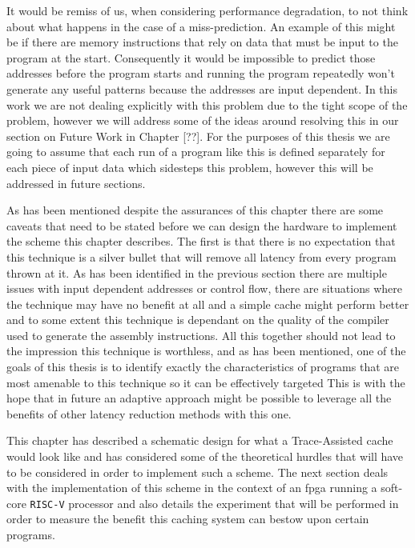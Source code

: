 It would be remiss of us, when considering performance degradation, to not think about what happens in the case of a miss-prediction. An example of this might be if there are memory instructions that rely on data that must be input to the program at the start. Consequently it would be impossible to predict those addresses before the program starts and running the program repeatedly won't generate any useful patterns because the addresses are input dependent. In this work we are not dealing explicitly with this problem due to the tight scope of the problem, however we will address some of the ideas around resolving this in our section on Future Work in Chapter [??]. For the purposes of this thesis we are going to assume that each run of a program like this is defined separately for each piece of input data which sidesteps this problem, however this will be addressed in future sections.

As has been mentioned despite the assurances of this chapter there are some caveats that need to be stated before we can design the hardware to implement the scheme this chapter describes. The first is that there is no expectation that this technique is a silver bullet that will remove all latency from every program thrown at it. As has been identified in the previous section there are multiple issues with input dependent addresses or control flow, there are situations where the technique may have no benefit at all and a simple cache might perform better and to some extent this technique is dependant on the quality of the compiler used to generate the assembly instructions. All this together should not lead to the impression this technique is worthless, and as has been mentioned, one of the goals of this thesis is to identify exactly the characteristics of programs that are most amenable to this technique so it can be effectively targeted This is with the hope that in future an adaptive approach might be possible to leverage all the benefits of other latency reduction methods with this one.

This chapter has described a schematic design for what a Trace-Assisted cache would look like and has considered some of the theoretical hurdles that will have to be considered in order to implement such a scheme. The next section deals with the implementation of this scheme in the context of an \gls{fpga} running a soft-core \texttt{RISC-V} processor and also details the experiment that will be performed in order to measure the benefit this caching system can bestow upon certain programs. 